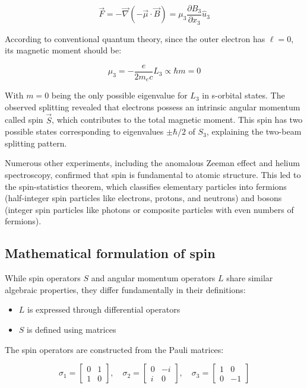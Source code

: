 \documentclass[italian]{HKNdocument}
\begin{document}
\begin{equation}
\vec{F}=-\vec{\nabla}(-\vec{\mu} \cdot \vec{B})=\mu_{3} \frac{\partial B_{3}}{\partial x_{3}} \hat{u}_{3} \label{eq:11.2}
\end{equation}

According to conventional quantum theory, since the outer electron has $\ell=0$, its magnetic moment should be:

\begin{equation}
\mu_{3}=-\frac{e}{2 m_{e} c} L_{3} \propto \hbar m=0 \label{eq:11.3}
\end{equation}

With $m=0$ being the only possible eigenvalue for $L_3$ in s-orbital states. The observed splitting revealed that electrons possess an intrinsic angular momentum called spin $\vec{S}$, which contributes to the total magnetic moment. This spin has two possible states corresponding to eigenvalues $\pm\hbar/2$ of $S_3$, explaining the two-beam splitting pattern.

Numerous other experiments, including the anomalous Zeeman effect and helium spectroscopy, confirmed that spin is fundamental to atomic structure. This led to the spin-statistics theorem, which classifies elementary particles into fermions (half-integer spin particles like electrons, protons, and neutrons) and bosons (integer spin particles like photons or composite particles with even numbers of fermions).

\subsection{Mathematical formulation of spin}
While spin operators $S$ and angular momentum operators $L$ share similar algebraic properties, they differ fundamentally in their definitions:

\begin{itemize}
  \item $L$ is expressed through differential operators
  \item $S$ is defined using matrices
\end{itemize}

The spin operators are constructed from the Pauli matrices:

\[
\sigma_{1}=\left[\begin{array}{ll}
0 & 1  \label{eq:11.4}\\
1 & 0
\end{array}\right], \quad \sigma_{2}=\left[\begin{array}{cc}
0 & -i \\
i & 0
\end{array}\right], \quad \sigma_{3}=\left[\begin{array}{cc}
1 & 0 \\
0 & -1
\end{array}\right]
\]
\end{document}
